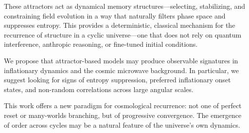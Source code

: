 \documentclass[12pt]{article}
\begin{document}
These attractors act as dynamical memory structures—selecting, stabilizing, and constraining field evolution in a way that naturally filters phase space and suppresses entropy. This provides a deterministic, classical mechanism for the recurrence of structure in a cyclic universe—one that does not rely on quantum interference, anthropic reasoning, or fine-tuned initial conditions.

We propose that attractor-based models may produce observable signatures in inflationary dynamics and the cosmic microwave background. In particular, we suggest looking for signs of entropy suppression, preferred inflationary onset states, and non-random correlations across large angular scales.

This work offers a new paradigm for cosmological recurrence: not one of perfect reset or many-worlds branching, but of progressive convergence. The emergence of order across cycles may be a natural feature of the universe’s own dynamics.
\end{document}
